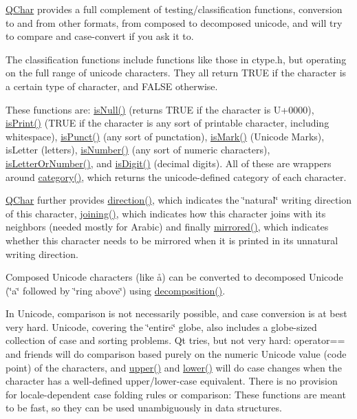 \hyperlink{class_q_char}{Q\-Char} provides a full complement of testing/classification functions, conversion to and from other formats, from composed to decomposed unicode, and will try to compare and case-\/convert if you ask it to.

The classification functions include functions like those in ctype.\-h, but operating on the full range of unicode characters. They all return T\-R\-U\-E if the character is a certain type of character, and F\-A\-L\-S\-E otherwise.

These functions are\-: \hyperlink{class_q_char_ac02f2a4d7312eb91f40980adfd4e31b2}{is\-Null()} (returns T\-R\-U\-E if the character is U+0000), \hyperlink{class_q_char_ae56bb417ddf53e85cb389267590fe969}{is\-Print()} (T\-R\-U\-E if the character is any sort of printable character, including whitespace), \hyperlink{class_q_char_ac54b651b84db9e34935a99b83c15e313}{is\-Punct()} (any sort of punctation), \hyperlink{class_q_char_aa44c38302b09368a983ead7d288c90fb}{is\-Mark()} (Unicode Marks), is\-Letter (letters), \hyperlink{class_q_char_a568ed3e0bc2528a51422e221bb75f3da}{is\-Number()} (any sort of numeric characters), \hyperlink{class_q_char_aa55a6068a2347ce0ec878be4ed349031}{is\-Letter\-Or\-Number()}, and \hyperlink{class_q_char_a610bceef174c008df7c7acbbdb76cdf3}{is\-Digit()} (decimal digits). All of these are wrappers around \hyperlink{class_q_char_a2a8a6abd50e8b95aa26ac2e14506c7a4}{category()}, which returns the unicode-\/defined category of each character.

\hyperlink{class_q_char}{Q\-Char} further provides \hyperlink{class_q_char_ab6fb1bffa65c7a841ce816ad15b0a2cb}{direction()}, which indicates the \char`\"{}natural\char`\"{} writing direction of this character, \hyperlink{class_q_char_a4e8aadfd094cc81e6d8d53a912bbbe32}{joining()}, which indicates how this character joins with its neighbors (needed mostly for Arabic) and finally \hyperlink{class_q_char_a1c8640d63d0a27963a2cdeb680fa399e}{mirrored()}, which indicates whether this character needs to be mirrored when it is printed in its unnatural writing direction.

Composed Unicode characters (like \aa) can be converted to decomposed Unicode (\char`\"{}a\char`\"{} followed by \char`\"{}ring above\char`\"{}) using \hyperlink{class_q_char_acba9fa01bc9c2d6aad7ef6e16e5aaa1d}{decomposition()}.

In Unicode, comparison is not necessarily possible, and case conversion is at best very hard. Unicode, covering the \char`\"{}entire\char`\"{} globe, also includes a globe-\/sized collection of case and sorting problems. Qt tries, but not very hard\-: operator== and friends will do comparison based purely on the numeric Unicode value (code point) of the characters, and \hyperlink{class_q_char_ac3676fc22ef9ffe55c28b8e70dd66f45}{upper()} and \hyperlink{class_q_char_a10df978cce889ffe3308eaab00829926}{lower()} will do case changes when the character has a well-\/defined upper/lower-\/case equivalent. There is no provision for locale-\/dependent case folding rules or comparison\-: These functions are meant to be fast, so they can be used unambiguously in data structures.

